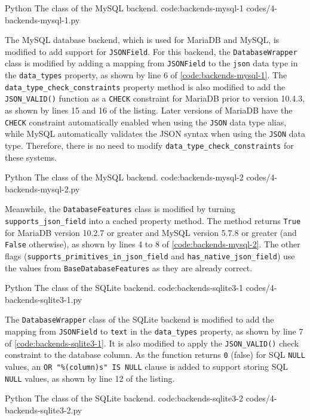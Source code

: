\listing
{Python}
{The  class of the MySQL backend.}
{code:backends-mysql-1}
{codes/4-backends-mysql-1.py}

The MySQL database backend, which is used for MariaDB and MySQL, is modified to
add support for \verb|JSONField|. For this backend, the \verb|DatabaseWrapper|
class is modified by adding a mapping from \verb|JSONField| to the \verb|json|
data type in the \verb|data_types| property, as shown by line 6 of
\autoref{code:backends-mysql-1}. The \verb|data_type_check_constraints|
property method is also modified to add the \verb|JSON_VALID()| function as a
\verb|CHECK| constraint for MariaDB prior to version 10.4.3, as shown by lines
15 and 16 of the listing. Later versions of MariaDB have the \verb|CHECK|
constraint automatically enabled when using the \verb|JSON| data type alias,
while MySQL automatically validates the JSON syntax when using the \verb|JSON|
data type. Therefore, there is no need to modify
\verb|data_type_check_constraints| for these systems.

\listing
{Python}
{The  class of the MySQL backend.}
{code:backends-mysql-2}
{codes/4-backends-mysql-2.py}

Meanwhile, the \verb|DatabaseFeatures| class is modified by turning
\verb|supports_json_field| into a cached property method. The method returns
\verb|True| for MariaDB version 10.2.7 or greater and MySQL version 5.7.8 or
greater (and \verb|False| otherwise), as shown by lines 4 to 8 of
\autoref{code:backends-mysql-2}. The other flags
(\verb|supports_primitives_in_json_field| and \verb|has_native_json_field|)
use the values from \verb|BaseDatabaseFeatures| as they are already correct.

\listing
{Python}
{The  class of the SQLite backend.}
{code:backends-sqlite3-1}
{codes/4-backends-sqlite3-1.py}

The \verb|DatabaseWrapper| class of the SQLite backend is modified to add the
mapping from \verb|JSONField| to \verb|text| in the \verb|data_types| property,
as shown by line 7 of \autoref{code:backends-sqlite3-1}. It is also modified to
apply the \verb|JSON_VALID()| check constraint to the database column. As the
function returns \verb|0| (false) for SQL \verb|NULL| values, an
\verb|OR "%(column)s" IS NULL| clause is added to support storing SQL
\verb|NULL| values, as shown by line 12 of the listing.

\listing
{Python}
{The  class of the SQLite backend.}
{code:backends-sqlite3-2}
{codes/4-backends-sqlite3-2.py}

